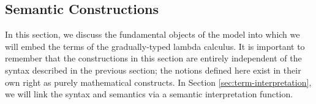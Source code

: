 \begin{comment}
      \inferrule*
      {\hasty \Gamma M (\dyntodyn)}
      {\hasty \Gamma {\injarr M} \dyn}

      \inferrule*
      {\hasty{\Delta|_V}{V}{\dyn} \and
        \hasty{\Delta , x : \nat }{M_{nat}}{B} \and 
        \hasty{\Delta , x : (\dyntodyn) }{M_{fun}}{B}
      }
      {\hasty {\Delta} {\casedyn{V}{n}{M_{nat}}{f}{M_{fun}}} {B}}
  \end{mathpar}
  \caption{New typing rules for $\extlcmm$.}
  \label{fig:extlc-minus-minus-typing}
\end{figure}


\begin{figure}
  \begin{mathpar}
     \inferrule*
     {\hasty \Gamma V \nat}
     {\casedyn {\injnat {V}} {n} {M_{nat}} {f} {M_{fun}} = M_{nat}[V/n]}

     \inferrule*
     {\hasty \Gamma V {\dyntodyn} }
     {\casedyn {\injarr {V}} {n} {M_{nat}} {f} {M_{fun}} = M_{fun}[V/f]}

     \inferrule*
     {}
     {\Gamma , x :\, \dyn \vdash M = \casedyn{x}{n}{M[(\injnat{n}) / x]}{f}{M[(\injarr{f}) / x]} }


  \end{mathpar}
  \caption{New equational rules for $\extlcprime$ (rules for case-arrow are analogous
           and hence are omitted).}
  \label{fig:extlc-minus-minus-eqns}
\end{figure}

\end{comment}



\subsection{Semantic Constructions}\label{sec:domain-theory}

In this section, we discuss the fundamental objects of the model into which we will embed
the terms of the gradually-typed lambda calculus.
It is important to remember that the constructions in this section are entirely
independent of the syntax described in the previous section; the notions defined 
here exist in their own right as purely mathematical constructs.
In Section \ref{sec:term-interpretation}, we will link the syntax and semantics
via a semantic interpretation function.


